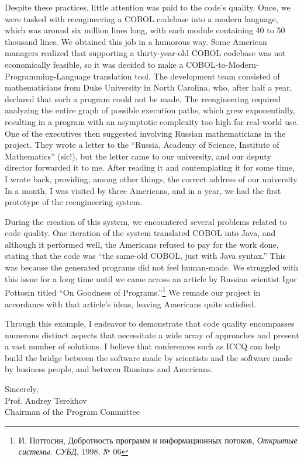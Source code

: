 Despite these practices, little attention was paid to the code's quality. Once, we were tasked with reengineering a COBOL codebase into a modern language, which was around six million lines long, with each module containing 40 to 50 thousand lines. We obtained this job in a humorous way. Some American managers realized that supporting a thirty-year-old COBOL codebase was not economically feasible, so it was decided to make a COBOL-to-Modern-Programming-Language translation tool. The development team consisted of mathematicians from Duke University in North Carolina, who, after half a year, declared that such a program could not be made. The reengineering required analyzing the entire graph of possible execution paths, which grew exponentially, resulting in a program with an asymptotic complexity too high for real-world use. One of the executives then suggested involving Russian mathematicians in the project. They wrote a letter to the ``Russia, Academy of Science, Institute of Mathematics'' (sic!), but the letter came to our university, and our deputy director forwarded it to me. After reading it and contemplating it for some time, I wrote back, providing, among other things, the correct address of our university. In a month, I was visited by three Americans, and in a year, we had the first prototype of the reengineering system.

During the creation of this system, we encountered several problems related to code quality. One iteration of the system translated COBOL into Java, and although it performed well, the Americans refused to pay for the work done, stating that the code was ``the same-old COBOL, just with Java syntax.'' This was because the generated programs did not feel human-made. We struggled with this issue for a long time until we came across an article by Russian scientist Igor Pottosin titled ``On Goodness of Programs.''\footnote{\raggedright{}\foreignlanguage{russian}{И. Поттосин, Добротность программ и информационных потоков, \textit{Открытые системы. СУБД}, 1998, № 06}} We remade our project in accordance with that article's ideas, leaving Americans quite satisfied.

Through this example, I endeavor to demonstrate that code quality encompasses numerous distinct aspects that necessitate a wide array of approaches and present a vast number of solutions. I believe that conferences such as ICCQ can help build the bridge between the software made by scientists and the software made by business people, and between Russians and Americans.

\vspace{18pt}
Sincerely,\\
Prof. Andrey Terekhov\\
Chairman of the Program Committee \\
